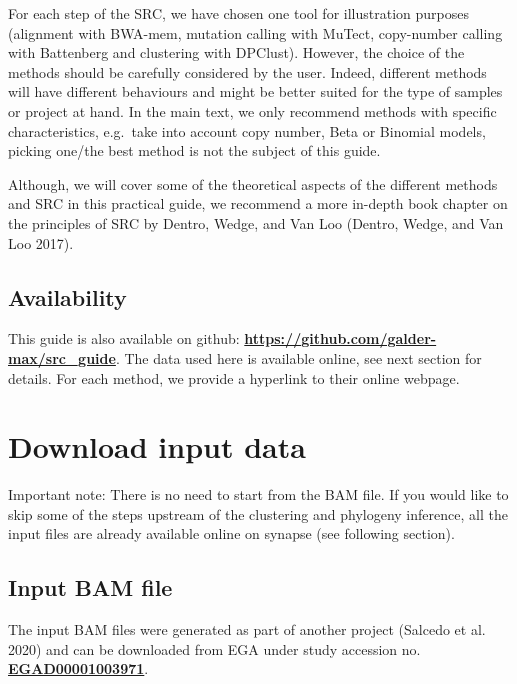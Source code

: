 \documentclass[]{article}
\begin{document}
For each step of the SRC, we have chosen one tool for illustration
purposes (alignment with BWA-mem, mutation calling with MuTect,
copy-number calling with Battenberg and clustering with DPClust).
However, the choice of the methods should be carefully considered by the
user. Indeed, different methods will have different behaviours and might
be better suited for the type of samples or project at hand. In the main
text, we only recommend methods with specific characteristics, e.g.~take
into account copy number, Beta or Binomial models, picking one/the best
method is not the subject of this guide.

Although, we will cover some of the theoretical aspects of the different
methods and SRC in this practical guide, we recommend a more in-depth
book chapter on the principles of SRC by Dentro, Wedge, and Van Loo
(Dentro, Wedge, and Van Loo 2017).

\hypertarget{availability}{%
\subsection{Availability}\label{availability}}

This guide is also available on github:
\textbf{\url{https://github.com/galder-max/src_guide}}. The data used
here is available online, see next section for details. For each method,
we provide a hyperlink to their online webpage.

\newpage

\hypertarget{download-input-data}{%
\section{Download input data}\label{download-input-data}}

Important note: There is no need to start from the BAM file. If you
would like to skip some of the steps upstream of the clustering and
phylogeny inference, all the input files are already available online on
synapse (see following section).

\hypertarget{input-bam-file}{%
\subsection{Input BAM file}\label{input-bam-file}}

The input BAM files were generated as part of another project (Salcedo
et al. 2020) and can be downloaded from EGA under study accession no.
\href{https://www.ebi.ac.uk/ega/studies/EGAS00001002092}{\textbf{EGAD00001003971}}.
\end{document}
